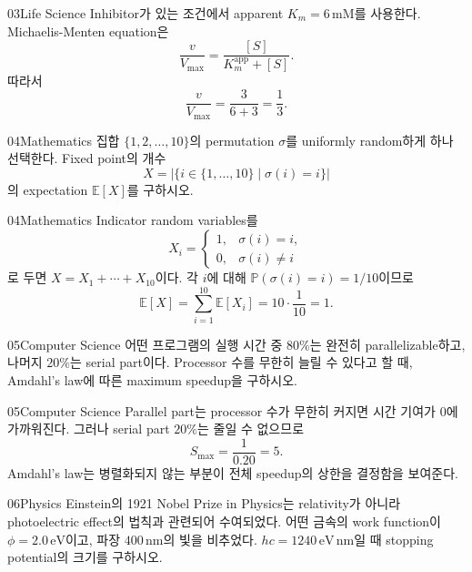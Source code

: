 \documentclass[12pt,aspectratio=169]{beamer}
\begin{document}
\begin{solutionframe}{03}{Life Science}
Inhibitor가 있는 조건에서 apparent $K_m=6\,\mathrm{mM}$를 사용한다. Michaelis-Menten equation은
\[
\frac{v}{V_{\max}}=\frac{[S]}{K_m^{\mathrm{app}}+[S]}.
\]
따라서
\[
\frac{v}{V_{\max}}=\frac{3}{6+3}=\frac13.
\]
\end{solutionframe}

\begin{problemframe}{04}{Mathematics}
집합 $\{1,2,\dots,10\}$의 permutation $\sigma$를 uniformly random하게 하나 선택한다. Fixed point의 개수
\[
X=\left|\{i\in\{1,\dots,10\}\mid\sigma(i)=i\}\right|
\]
의 expectation $\mathbb{E}[X]$를 구하시오.
\end{problemframe}

\begin{solutionframe}{04}{Mathematics}
Indicator random variables를
\[
X_i=\begin{cases}
1,&\sigma(i)=i,\\
0,&\sigma(i)\ne i
\end{cases}
\]
로 두면 $X=X_1+\cdots+X_{10}$이다. 각 $i$에 대해 $\mathbb{P}(\sigma(i)=i)=1/10$이므로
\[
\mathbb{E}[X]=\sum_{i=1}^{10}\mathbb{E}[X_i]=10\cdot\frac1{10}=1.
\]
\end{solutionframe}

\begin{problemframe}{05}{Computer Science}
어떤 프로그램의 실행 시간 중 $80\%$는 완전히 parallelizable하고, 나머지 $20\%$는 serial part이다. Processor 수를 무한히 늘릴 수 있다고 할 때, Amdahl's law에 따른 maximum speedup을 구하시오.
\end{problemframe}

\begin{solutionframe}{05}{Computer Science}
Parallel part는 processor 수가 무한히 커지면 시간 기여가 $0$에 가까워진다. 그러나 serial part $20\%$는 줄일 수 없으므로
\[
S_{\max}=\frac{1}{0.20}=5.
\]
Amdahl's law는 병렬화되지 않는 부분이 전체 speedup의 상한을 결정함을 보여준다.
\end{solutionframe}

\begin{problemframe}{06}{Physics}
Einstein의 1921 Nobel Prize in Physics는 relativity가 아니라 photoelectric effect의 법칙과 관련되어 수여되었다. 어떤 금속의 work function이 $\phi=2.0\,\mathrm{eV}$이고, 파장 $400\,\mathrm{nm}$의 빛을 비추었다. $hc=1240\,\mathrm{eV\,nm}$일 때 stopping potential의 크기를 구하시오.
\end{problemframe}
\end{document}
